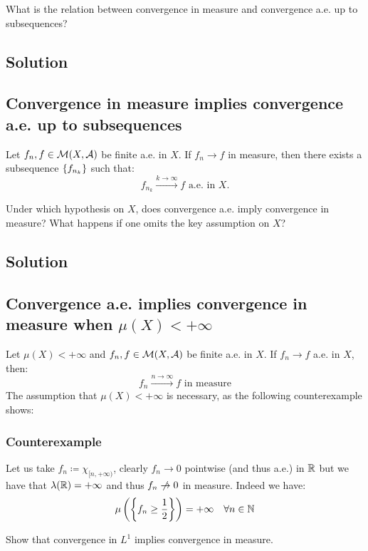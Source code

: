 \question
What is the relation between convergence in measure and convergence a.e. up to subsequences?

\subsection*{Solution}

\subsection{Convergence in measure implies convergence a.e. up to subsequences} \label{measure->aesubs}
Let $f_n,f \in \mathcal{M}(X,\mathcal{A})$ be finite a.e. in $X$. If $f_n \to f$ in measure, then there exists a subsequence $\{ f_{n_k} \}$ such that:
\[
    f_{n_k} \xrightarrow{k\to\infty} f \text{ a.e. in } X.
\]


\question
Under which hypothesis on $X$, does convergence a.e. imply convergence in measure? What happens if one omits the key assumption on $X$?

\subsection*{Solution}

\subsection{Convergence a.e. implies convergence in measure when \texorpdfstring{$\mu(X)<+\infty$}{ the measure of X is finite}}
Let $\mu(X)<+\infty$ and $f_n,f \in \mathcal{M}(X,\mathcal{A})$ be finite a.e. in $X$. If $f_n \to f$ a.e. in $X$, then:
\[
    f_n \xrightarrow{n\to\infty} f \text{ in measure}    
\]
The assumption that $\mu(X)<+\infty$ is necessary, as the following counterexample shows:

\subsubsection{Counterexample}
Let us take $f_n \coloneqq \chi_{[n,+\infty)}$, clearly $f_n \to 0$ pointwise (and thus a.e.) in $\mathbb{R}$ but we have that $\lambda(\mathbb{R})=+\infty$ and thus $f_n \centernot\to 0$ in measure. Indeed we have:
\[
    \mu \left( \left\{ f_n \geq \frac{1}{2} \right\} \right) = +\infty \quad \forall n \in \mathbb{N} 
\]


\question
Show that convergence in $L^1$ implies convergence in measure.

